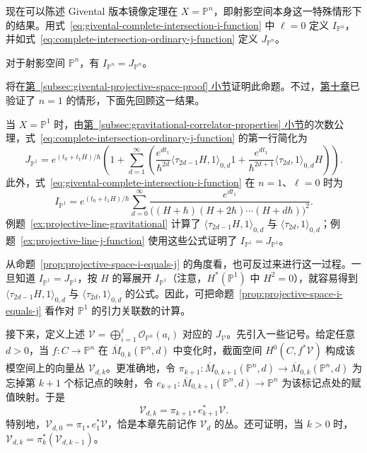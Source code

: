 现在可以陈述 Givental 版本镜像定理在 $X=\mathbb P^n$，即射影空间本身这一特殊情形下的结果。用式~\eqref{eq:givental-complete-intersection-i-function} 中 $\ell=0$ 定义 $I_{\mathbb P^n}$，并如式~\eqref{eq:complete-intersection-ordinary-j-function} 定义 $J_{\mathbb P^n}$。
\begin{proposition}\label{prop:projective-space-i-equals-j}
对于射影空间 $\mathbb P^n$，有 $I_{\mathbb P^n}=J_{\mathbb P^n}$。
\end{proposition}
将在\hyperref[subsec:givental-projective-space-proof]{第~\ref*{subsec:givental-projective-space-proof} 小节}证明此命题。不过，\hyperref[chap:quantum-differential-equations]{第十章}已验证了 $n=1$ 的情形，下面先回顾这一结果。
\begin{example}\label{ex:projective-line-i-j-equality}
当 $X=\mathbb P^1$ 时，由\hyperref[subsec:gravitational-correlator-properties]{第~\ref*{subsec:gravitational-correlator-properties} 小节}的次数公理，式~\eqref{eq:complete-intersection-ordinary-j-function} 的第一行简化为
\[
J_{\mathbb P^1}=e^{(t_0+t_1H)/\hbar}
\left(1+\sum_{d=1}^{\infty}\left(
\frac{e^{dt_1}}{\hbar^{2d}}\langle\tau_{2d-1}H,1\rangle_{0,d}1
+\frac{e^{dt_1}}{\hbar^{2d+1}}\langle\tau_{2d},1\rangle_{0,d}H\right)\right).
\]
此外，式~\eqref{eq:givental-complete-intersection-i-function} 在 $n=1$、$\ell=0$ 时为
\[
I_{\mathbb P^1}=e^{(t_0+t_1H)/\hbar}\sum_{d=0}^{\infty}
\frac{e^{dt_1}}{\bigl((H+\hbar)(H+2\hbar)\cdots(H+d\hbar)\bigr)^2}.
\]
例题~\ref{ex:projective-line-gravitational} 计算了 $\langle\tau_{2d-1}H,1\rangle_{0,d}$ 与 $\langle\tau_{2d},1\rangle_{0,d}$；例题~\ref{ex:projective-line-j-function} 使用这些公式证明了 $I_{\mathbb P^1}=J_{\mathbb P^1}$。

从命题~\ref{prop:projective-space-i-equals-j} 的角度看，也可反过来进行这一过程。一旦知道 $I_{\mathbb P^1}=J_{\mathbb P^1}$，按 $H$ 的幂展开 $I_{\mathbb P^1}$（注意，$H^*(\mathbb P^1)$ 中 $H^2=0$），就容易得到 $\langle\tau_{2d-1}H,1\rangle_{0,d}$ 与 $\langle\tau_{2d},1\rangle_{0,d}$ 的公式。因此，可把命题~\ref{prop:projective-space-i-equals-j} 看作对 $\mathbb P^1$ 的引力关联数的计算。
\end{example}

接下来，定义上述 $\mathcal V=\bigoplus_{i=1}^{\ell}\mathcal O_{\mathbb P^n}(a_i)$ 对应的 $J_{\mathcal V}$。先引入一些记号。给定任意 $d>0$，当 $f:C\to\mathbb P^n$ 在 $\overline M_{0,k}(\mathbb P^n,d)$ 中变化时，截面空间 $H^0(C,f^*\mathcal V)$ 构成该模空间上的向量丛 $\mathcal V_{d,k}$。更准确地，令 $\pi_{k+1}:\overline M_{0,k+1}(\mathbb P^n,d)\to\overline M_{0,k}(\mathbb P^n,d)$ 为忘掉第 $k+1$ 个标记点的映射，令 $e_{k+1}:\overline M_{0,k+1}(\mathbb P^n,d)\to\mathbb P^n$ 为该标记点处的赋值映射。于是
\[
\mathcal V_{d,k}=\pi_{k+1*}e_{k+1}^*\mathcal V.
\]
特别地，$\mathcal V_{d,0}=\pi_{1*}e_1^*\mathcal V$，恰是本章先前记作 $\mathcal V_d$ 的丛。还可证明，当 $k>0$ 时，$\mathcal V_{d,k}=\pi_k^*(\mathcal V_{d,k-1})$。

